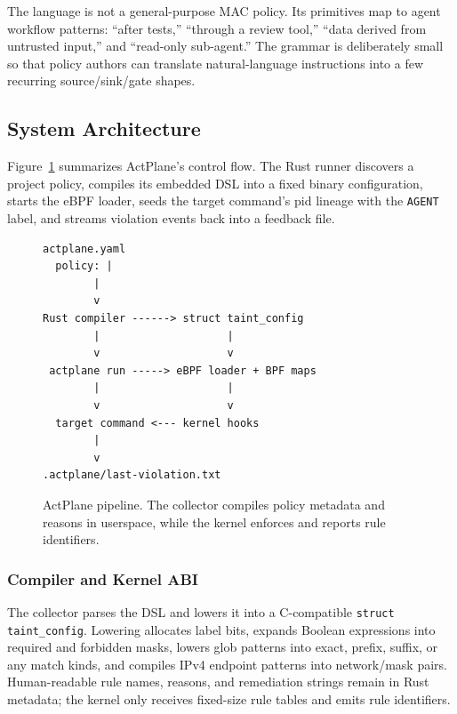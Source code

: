 The language is not a general-purpose MAC policy. Its primitives
map to agent workflow patterns: ``after tests,'' ``through a review tool,''
``data derived from untrusted input,'' and ``read-only sub-agent.'' The grammar
is deliberately small so that policy authors can translate natural-language
instructions into a few recurring source/sink/gate shapes.

\subsection{System Architecture}

Figure~\ref{fig:architecture} summarizes ActPlane's control flow. The Rust
runner discovers a project policy, compiles its embedded DSL into a fixed binary
configuration, starts the eBPF loader, seeds the target command's pid lineage
with the \texttt{AGENT} label, and streams violation events back into a feedback
file.

\begin{figure}[t]
\begin{verbatim}
actplane.yaml
  policy: |
        |
        v
Rust compiler ------> struct taint_config
        |                    |
        v                    v
 actplane run -----> eBPF loader + BPF maps
        |                    |
        v                    v
  target command <--- kernel hooks
        |
        v
.actplane/last-violation.txt
\end{verbatim}
\caption{ActPlane pipeline. The collector compiles policy metadata and reasons
in userspace, while the kernel enforces and reports rule identifiers.}
\label{fig:architecture}
\end{figure}

\subsubsection{Compiler and Kernel ABI}

The collector parses the DSL and lowers it into a C-compatible
\texttt{struct taint\_config}. Lowering allocates label bits, expands Boolean
expressions into required and forbidden masks, lowers glob patterns into exact,
prefix, suffix, or any match kinds, and compiles IPv4 endpoint patterns into
network/mask pairs. Human-readable rule names, reasons, and remediation strings
remain in Rust metadata; the kernel only receives fixed-size rule tables and
emits rule identifiers.

